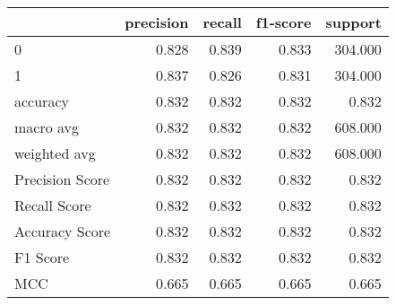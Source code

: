 \begin{tabular}{lrrrr}
\toprule
{} &  precision &  recall &  f1-score &  support \\
\midrule
0               &      0.828 &   0.839 &     0.833 &  304.000 \\
1               &      0.837 &   0.826 &     0.831 &  304.000 \\
accuracy        &      0.832 &   0.832 &     0.832 &    0.832 \\
macro avg       &      0.832 &   0.832 &     0.832 &  608.000 \\
weighted avg    &      0.832 &   0.832 &     0.832 &  608.000 \\
Precision Score &      0.832 &   0.832 &     0.832 &    0.832 \\
Recall Score    &      0.832 &   0.832 &     0.832 &    0.832 \\
Accuracy Score  &      0.832 &   0.832 &     0.832 &    0.832 \\
F1 Score        &      0.832 &   0.832 &     0.832 &    0.832 \\
MCC             &      0.665 &   0.665 &     0.665 &    0.665 \\
\bottomrule
\end{tabular}
